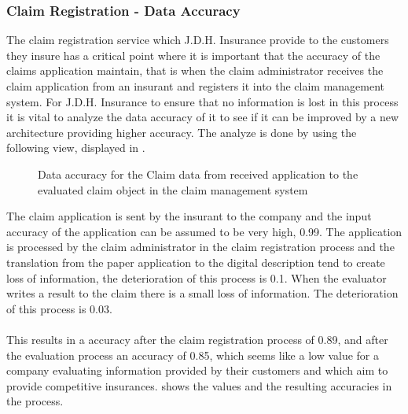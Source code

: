\subsubsection{Claim Registration - Data Accuracy}
\label{sec:claim_analysis}
The claim registration service which J.D.H. Insurance provide to the customers they insure has a critical point where it is important that the accuracy of the claims application maintain, that is when the claim administrator receives the claim application from an insurant and registers it into the claim management system. For J.D.H. Insurance to ensure that no information is lost in this process it is vital to analyze the data accuracy of it to see if it can be improved by a new architecture providing higher accuracy. The analyze is done by using the following view, displayed in .
\begin{center}
	\begin{figure}[H]
		\centering
		\setlength\fboxsep{7pt}
		\setlength\fboxrule{0.5pt}
		\caption{Data accuracy for the Claim data from received application to the evaluated claim object in the claim management system}
		\label{fig:map_claim_data}
	\end{figure}
\end{center}
The claim application is sent by the insurant to the company and the input accuracy of the application can be assumed to be very high, 0.99. The application is processed by the claim administrator in the claim registration process and the translation from the paper application to the digital description tend to create loss of information, the deterioration of this process is 0.1. When the evaluator writes a result to the claim there is a small loss of information. The deterioration of this process is 0.03. \\\\ 
%
This results in a accuracy after the claim registration process of 0.89, and after the evaluation process an accuracy of 0.85, which seems like a low value for a company evaluating information provided by their customers and which aim to provide competitive insurances.  shows the values and the resulting accuracies in the process.

%
